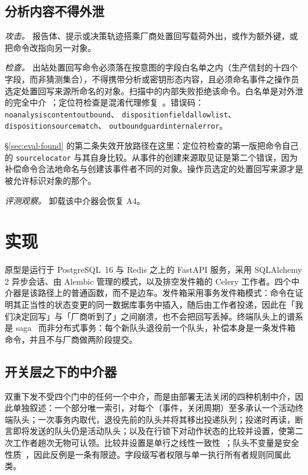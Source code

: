 \documentclass[acmsmall,manuscript,review,anonymous]{acmart}
\renewcommand{\_}{\discretionary{\textunderscore}{}{\textunderscore}}
\begin{document}
\subsection{分析内容不得外泄}
\label{sec:design-egress}

\emph{攻击。} 报告体、提示或决策轨迹搭乘厂商处置回写载荷外出，或作为额外键，或把命令改指向另一对象。

\emph{检查。} 出站处置回写命令必须落在按意图的字段白名单之内（生产信封的十四个字段，而非猜测集合），不得携带分析或密钥形态内容，且必须命名事件之操作员选定处置回写来源所命名的对象。扫描中的内部失败拒绝该命令。白名单是对外泄的完全中介~\cite{saltzer1975protection}；定位符检查是混淆代理修复~\cite{hardy1988confused}。错误码：
\texttt{no\_analysis\_content\_outbound}、
\texttt{disposition\_field\_allowlist}、
\texttt{disposition\_source\_match}、
\texttt{outbound\_guard\_internal\_error}。

\S\ref{sec:eval-found} 的第二条失效开放路径在这里：定位符检查的第一版把命令自己的 \texttt{source\_locator} 与其自身比较。从事件的创建来源取见证是第二个错误，因为补偿命令合法地命名与创建该事件者不同的对象。操作员选定的处置回写来源才是被允许标识对象的那个。

\emph{评测观察。} 卸载该中介器会恢复 A4。

\section{实现}
\label{sec:impl}

原型是运行于 {PostgreSQL}~16 与 {Redis} 之上的 {FastAPI} 服务，采用 {SQLAlchemy}
2 异步会话、由 {Alembic} 管理的模式，以及排空发件箱的 {Celery} 工作者。四个中介器是该路径上的普通函数，而不是边车。发件箱采用事务发件箱模式：命令在证明其正当性的状态变更的同一数据库事务中插入，随后由工作者投递，因此在「我们决定回写」与「厂商听到了」之间崩溃，也不会把回写丢掉。终端队头上的谱系是 saga~\cite{garciamolina1987sagas} 而非分布式事务：每个新队头退役前一个队头，补偿本身是一条发件箱命令，并且不与厂商做两阶段提交。

\subsection{开关层之下的中介器}
\label{sec:impl-nonswitch}

双重下发不受四个门中的任何一个中介，而是由部署无法关闭的四种机制中介，因此单独叙述：一个部分唯一索引，对每个（事件，关闭周期）至多承认一个活动终端队头；一次事务内取代，退役先前的队头并将其移出投递队列；投递时再读，断言即将发送的队头仍是活动队头；以及在行锁下对动作状态的比较并设置，使第二次工作者趟次无物可认领。比较并设置是单行之线性一致性~\cite{herlihy1990linearizability}；队头不变量是安全性质~\cite{alpern1989defining}，因此反例是一条有限迹。字段级写者权限与单一执行所有者规则同属此类。
\end{document}
